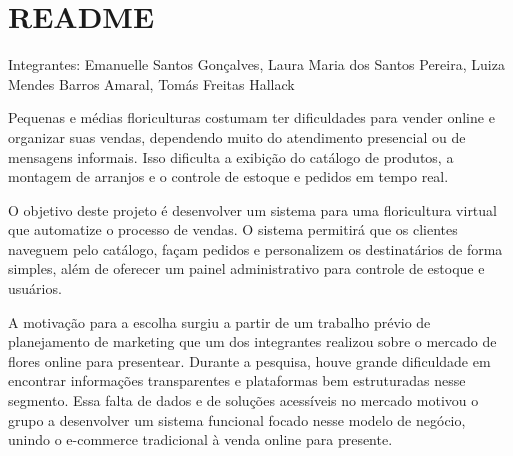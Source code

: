 \chapter{README }
\hypertarget{md__r_e_a_d_m_e}{}\label{md__r_e_a_d_m_e}
Integrantes: Emanuelle Santos Gonçalves, Laura Maria dos Santos Pereira, Luiza Mendes Barros Amaral, Tomás Freitas Hallack

Pequenas e médias floriculturas costumam ter dificuldades para vender online e organizar suas vendas, dependendo muito do atendimento presencial ou de mensagens informais. Isso dificulta a exibição do catálogo de produtos, a montagem de arranjos e o controle de estoque e pedidos em tempo real.

O objetivo deste projeto é desenvolver um sistema para uma floricultura virtual que automatize o processo de vendas. O sistema permitirá que os clientes naveguem pelo catálogo, façam pedidos e personalizem os destinatários de forma simples, além de oferecer um painel administrativo para controle de estoque e usuários.

A motivação para a escolha surgiu a partir de um trabalho prévio de planejamento de marketing que um dos integrantes realizou sobre o mercado de flores online para presentear. Durante a pesquisa, houve grande dificuldade em encontrar informações transparentes e plataformas bem estruturadas nesse segmento. Essa falta de dados e de soluções acessíveis no mercado motivou o grupo a desenvolver um sistema funcional focado nesse modelo de negócio, unindo o e-\/commerce tradicional à venda online para presente. 